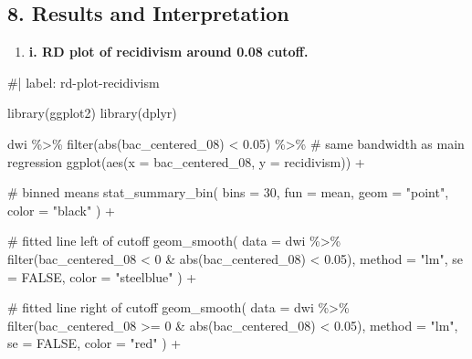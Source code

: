 \documentclass[
  letterpaper,
  DIV=11,
  numbers=noendperiod]{scrartcl}
\newenvironment{Shaded}{\begin{snugshade}}{\end{snugshade}}
\newcommand{\AttributeTok}[1]{\textcolor[rgb]{0.40,0.45,0.13}{#1}}
\newcommand{\CommentTok}[1]{\textcolor[rgb]{0.37,0.37,0.37}{#1}}
\newcommand{\ConstantTok}[1]{\textcolor[rgb]{0.56,0.35,0.01}{#1}}
\newcommand{\DecValTok}[1]{\textcolor[rgb]{0.68,0.00,0.00}{#1}}
\newcommand{\FloatTok}[1]{\textcolor[rgb]{0.68,0.00,0.00}{#1}}
\newcommand{\FunctionTok}[1]{\textcolor[rgb]{0.28,0.35,0.67}{#1}}
\newcommand{\NormalTok}[1]{\textcolor[rgb]{0.00,0.23,0.31}{#1}}
\newcommand{\SpecialCharTok}[1]{\textcolor[rgb]{0.37,0.37,0.37}{#1}}
\newcommand{\StringTok}[1]{\textcolor[rgb]{0.13,0.47,0.30}{#1}}
\providecommand{\tightlist}{%
  \setlength{\itemsep}{0pt}\setlength{\parskip}{0pt}}
\begin{document}
\subsection{8. Results and
Interpretation}\label{results-and-interpretation}

\begin{enumerate}
\def\labelenumi{\arabic{enumi}.}
\setcounter{enumi}{7}
\tightlist
\item
  \textbf{i. RD plot of recidivism around 0.08 cutoff.}
\end{enumerate}

\begin{Shaded}
\begin{Highlighting}[]
\CommentTok{\#| label: rd{-}plot{-}recidivism}

\FunctionTok{library}\NormalTok{(ggplot2)}
\FunctionTok{library}\NormalTok{(dplyr)}

\NormalTok{dwi }\SpecialCharTok{\%\textgreater{}\%}
  \FunctionTok{filter}\NormalTok{(}\FunctionTok{abs}\NormalTok{(bac\_centered\_08) }\SpecialCharTok{\textless{}} \FloatTok{0.05}\NormalTok{) }\SpecialCharTok{\%\textgreater{}\%}   \CommentTok{\# same bandwidth as main regression}
  \FunctionTok{ggplot}\NormalTok{(}\FunctionTok{aes}\NormalTok{(}\AttributeTok{x =}\NormalTok{ bac\_centered\_08, }\AttributeTok{y =}\NormalTok{ recidivism)) }\SpecialCharTok{+}

  \CommentTok{\# binned means}
  \FunctionTok{stat\_summary\_bin}\NormalTok{(}
    \AttributeTok{bins =} \DecValTok{30}\NormalTok{,}
    \AttributeTok{fun =}\NormalTok{ mean,}
    \AttributeTok{geom =} \StringTok{"point"}\NormalTok{,}
    \AttributeTok{color =} \StringTok{"black"}
\NormalTok{  ) }\SpecialCharTok{+}

  \CommentTok{\# fitted line left of cutoff}
  \FunctionTok{geom\_smooth}\NormalTok{(}
    \AttributeTok{data =}\NormalTok{ dwi }\SpecialCharTok{\%\textgreater{}\%} \FunctionTok{filter}\NormalTok{(bac\_centered\_08 }\SpecialCharTok{\textless{}} \DecValTok{0} \SpecialCharTok{\&} \FunctionTok{abs}\NormalTok{(bac\_centered\_08) }\SpecialCharTok{\textless{}} \FloatTok{0.05}\NormalTok{),}
    \AttributeTok{method =} \StringTok{"lm"}\NormalTok{,}
    \AttributeTok{se =} \ConstantTok{FALSE}\NormalTok{,}
    \AttributeTok{color =} \StringTok{"steelblue"}
\NormalTok{  ) }\SpecialCharTok{+}

  \CommentTok{\# fitted line right of cutoff}
  \FunctionTok{geom\_smooth}\NormalTok{(}
    \AttributeTok{data =}\NormalTok{ dwi }\SpecialCharTok{\%\textgreater{}\%} \FunctionTok{filter}\NormalTok{(bac\_centered\_08 }\SpecialCharTok{\textgreater{}=} \DecValTok{0} \SpecialCharTok{\&} \FunctionTok{abs}\NormalTok{(bac\_centered\_08) }\SpecialCharTok{\textless{}} \FloatTok{0.05}\NormalTok{),}
    \AttributeTok{method =} \StringTok{"lm"}\NormalTok{,}
    \AttributeTok{se =} \ConstantTok{FALSE}\NormalTok{,}
    \AttributeTok{color =} \StringTok{"red"}
\NormalTok{  ) }\SpecialCharTok{+}


\end{Highlighting}
\end{Shaded}
\end{document}
